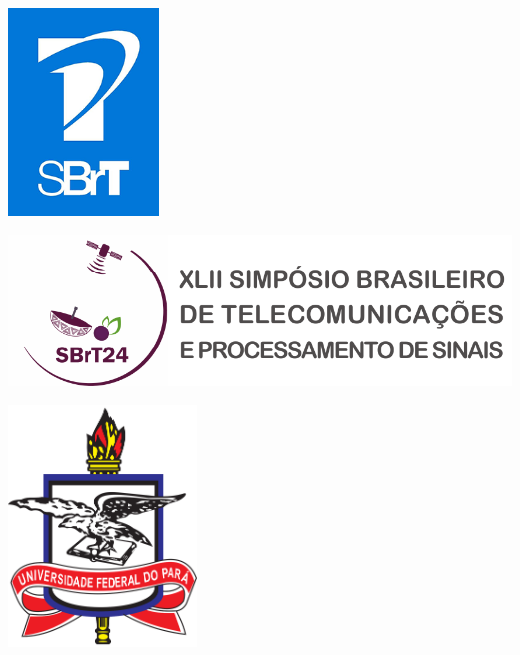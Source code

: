 \documentclass[a0,portrait]{a0poster}
\begin{document}
\begin{mdframed}[style=MyFrame]

\begin{minipage}[b]{0.33\linewidth}
\raggedright
\includegraphics[width=4cm,valign=t]{figures/logo_sbrt_hd.png}
\end{minipage}
%
\begin{minipage}[b]{0.33\linewidth}
\centering
\includegraphics[width=20cm,valign=t]{figures/img_sbrt24_poster.pdf}
\end{minipage}
% 
\begin{minipage}[b]{0.33\linewidth}
\raggedleft
\includegraphics[width=5cm,valign=t]{figures/logo_ufpa.png}
\end{minipage}\\


\end{mdframed}
\end{document}
